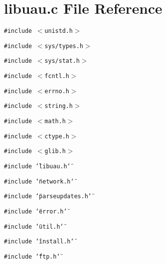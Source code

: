 \section{libuau.c File Reference}
\label{libuau_8c}
{\tt \#include $<$unistd.h$>$}\par
{\tt \#include $<$sys/types.h$>$}\par
{\tt \#include $<$sys/stat.h$>$}\par
{\tt \#include $<$fcntl.h$>$}\par
{\tt \#include $<$errno.h$>$}\par
{\tt \#include $<$string.h$>$}\par
{\tt \#include $<$math.h$>$}\par
{\tt \#include $<$ctype.h$>$}\par
{\tt \#include $<$glib.h$>$}\par
{\tt \#include \char`\"{}libuau.h\char`\"{}}\par
{\tt \#include \char`\"{}network.h\char`\"{}}\par
{\tt \#include \char`\"{}parseupdates.h\char`\"{}}\par
{\tt \#include \char`\"{}error.h\char`\"{}}\par
{\tt \#include \char`\"{}util.h\char`\"{}}\par
{\tt \#include \char`\"{}install.h\char`\"{}}\par
{\tt \#include \char`\"{}ftp.h\char`\"{}}\par
